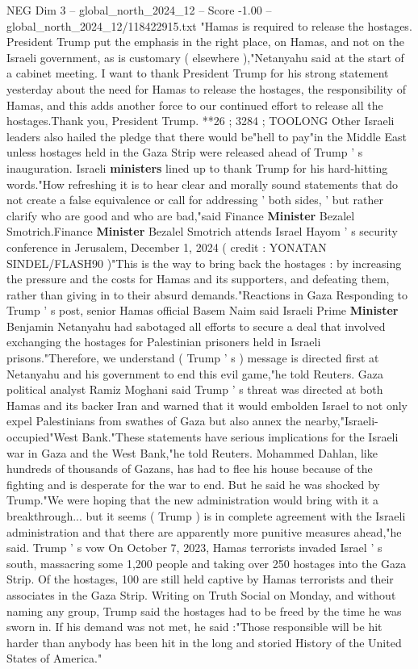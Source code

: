 \begin{textsample}{NEG Dim 3 – global\_north\_2024\_12 – Score -1.00 – global\_north\_2024\_12/118422915.txt}  \label{ex:f3_neg_228}
"Hamas is required to release the hostages.
President Trump put the emphasis in the right place, on Hamas, and not on the Israeli government, as is customary ( elsewhere ),"Netanyahu said at the start of a cabinet meeting.
I want to thank President Trump for his strong statement yesterday about the need for Hamas to release the hostages, the responsibility of Hamas, and this adds another force to our continued effort to release all the hostages.Thank you, President Trump. **26 ; 3284 ; TOOLONG Other Israeli leaders also hailed the pledge that there would be"hell to pay"in the Middle East unless hostages held in the Gaza Strip were released ahead of Trump ' s inauguration.
Israeli \textbf{ministers} lined up to thank Trump for his hard-hitting words."How refreshing it is to hear clear and morally sound statements that do not create a false equivalence or call for addressing ' both sides, ' but rather clarify who are good and who are bad,"said Finance \textbf{Minister} Bezalel Smotrich.Finance \textbf{Minister} Bezalel Smotrich attends Israel Hayom ' s security conference in Jerusalem, December 1, 2024 ( credit : YONATAN SINDEL/FLASH90 )"This is the way to bring back the hostages : by increasing the pressure and the costs for Hamas and its supporters, and defeating them, rather than giving in to their absurd demands."Reactions in Gaza Responding to Trump ' s post, senior Hamas official Basem Naim said Israeli Prime \textbf{Minister} Benjamin Netanyahu had sabotaged all efforts to secure a deal that involved exchanging the hostages for Palestinian prisoners held in Israeli prisons."Therefore, we understand ( Trump ' s ) message is directed first at Netanyahu and his government to end this evil game,"he told Reuters.
Gaza political analyst Ramiz Moghani said Trump ' s threat was directed at both Hamas and its backer Iran and warned that it would embolden Israel to not only expel Palestinians from swathes of Gaza but also annex the nearby,"Israeli-occupied"West Bank."These statements have serious implications for the Israeli war in Gaza and the West Bank,"he told Reuters.
Mohammed Dahlan, like hundreds of thousands of Gazans, has had to flee his house because of the fighting and is desperate for the war to end.
But he said he was shocked by Trump."We were hoping that the new administration would bring with it a breakthrough... but it seems ( Trump ) is in complete agreement with the Israeli administration and that there are apparently more punitive measures ahead,"he said.
Trump ' s vow On October 7, 2023, Hamas terrorists invaded Israel ' s south, massacring some 1,200 people and taking over 250 hostages into the Gaza Strip.
Of the hostages, 100 are still held captive by Hamas terrorists and their associates in the Gaza Strip.
Writing on Truth Social on Monday, and without naming any group, Trump said the hostages had to be freed by the time he was sworn in.
If his demand was not met, he said :"Those responsible will be hit harder than anybody has been hit in the long and storied History of the United States of America."

\end{textsample}
